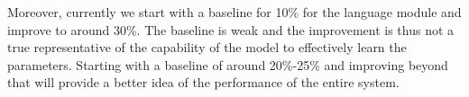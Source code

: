 Moreover, currently we start with a baseline for 10\% for the language module and improve to around 30\%. The baseline is weak and the improvement is thus not a true representative of the capability of the model to effectively learn the parameters. Starting with a baseline of around 20\%-25\% and improving beyond that will provide a better idea of the performance of the entire system.



